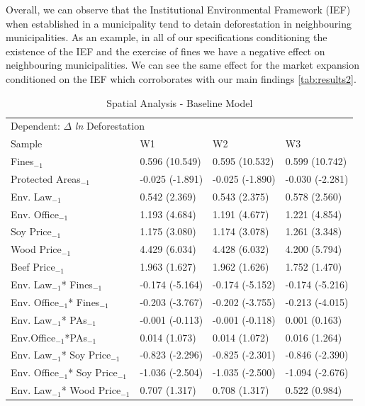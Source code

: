 Overall, we can observe that the Institutional Environmental Framework (IEF) when established in a municipality tend to detain deforestation in neighbouring municipalities. As an example, in all of our specifications conditioning the existence of the IEF and the exercise of fines we have a negative effect on neighbouring municipalities. We can see the same effect for the market expansion conditioned on the IEF which corroborates with our main findings \ref{tab:results2}. 

\begin{table}[ht!]
\caption{Spatial Analysis - Baseline Model}
\footnotesize
       \begin{tabularx}{1\textwidth}{l XXX}
     \hline
     \hline
        \multicolumn{4}{l}{Dependent: $\Delta$ \textit{ln} Deforestation}\\ \cline{1-4}
    Sample & W1 & W2 & W3 \\
        \hline
    Fines$_{-1}$ &	0.596	(10.549) &	0.595 (10.532) &	0.599	(10.742)\\
    Protected Areas$_{-1}$ &	-0.025	(-1.891)&	-0.025 (-1.890) &	-0.030	(-2.281) \\
    Env. Law$_{-1}$ &	0.542	(2.369) &	0.543 (2.375) &	0.578	(2.560) \\
    Env. Office$_{-1}$&	1.193	(4.684) &	1.191 (4.677) &	1.221	(4.854)\\
    Soy Price$_{-1}$&	1.175	(3.080) & 1.174 (3.078)	 &	1.261	(3.348)\\
    Wood Price$_{-1}$&	4.429	(6.034) & 4.428 (6.032)& 	4.200	(5.794)	\\
    Beef Price$_{-1}$	&	1.963	(1.627) & 1.962 (1.626)& 1.752	(1.470)\\
    Env. Law$_{-1}$* Fines$_{-1}$	&	-0.174	(-5.164) & -0.174	(-5.152)&	-0.174	(-5.216)\\
    Env. Office$_{-1}$* Fines$_{-1}$&	-0.203	(-3.767) & -0.202	(-3.755)&	-0.213	(-4.015) 	\\
    Env. Law$_{-1}$* PAs$_{-1}$	&	-0.001	(-0.113) & -0.001	(-0.118)& 0.001	(0.163)\\
    Env.Office$_{-1}$*PAs$_{-1}$  &	0.014	(1.073) &	 0.014	(1.072)& 0.016	(1.264)\\
    Env. Law$_{-1}$* Soy Price$_{-1}$	&	-0.823	(-2.296) & -0.825	(-2.301)& 	-0.846	(-2.390) \\
    Env. Office$_{-1}$* Soy Price$_{-1}$&	-1.036	(-2.504) &		-1.035	(-2.500)& -1.094	(-2.676)\\
    Env. Law$_{-1}$* Wood Price$_{-1}$&	0.707	(1.317) &	0.708	(1.317)& 0.522	(0.984)\\

\end{tabularx}
\end{table}
